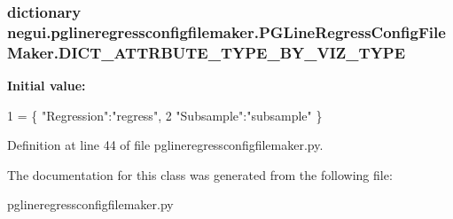 \subsubsection[{\texorpdfstring{D\+I\+C\+T\+\_\+\+A\+T\+T\+R\+B\+U\+T\+E\+\_\+\+T\+Y\+P\+E\+\_\+\+B\+Y\+\_\+\+V\+I\+Z\+\_\+\+T\+Y\+PE}{DICT_ATTRBUTE_TYPE_BY_VIZ_TYPE}}]{\setlength{\rightskip}{0pt plus 5cm}dictionary negui.\+pglineregressconfigfilemaker.\+P\+G\+Line\+Regress\+Config\+File\+Maker.\+D\+I\+C\+T\+\_\+\+A\+T\+T\+R\+B\+U\+T\+E\+\_\+\+T\+Y\+P\+E\+\_\+\+B\+Y\+\_\+\+V\+I\+Z\+\_\+\+T\+Y\+PE\hspace{0.3cm}{\ttfamily [static]}}\hypertarget{classnegui_1_1pglineregressconfigfilemaker_1_1PGLineRegressConfigFileMaker_ae1c084179b0f58c480d6809e46361a9f}{}\label{classnegui_1_1pglineregressconfigfilemaker_1_1PGLineRegressConfigFileMaker_ae1c084179b0f58c480d6809e46361a9f}
{\bfseries Initial value\+:}
\begin{DoxyCode}
1 = \{ \textcolor{stringliteral}{"Regression"}:\textcolor{stringliteral}{"regress"}, 
2                                         \textcolor{stringliteral}{"Subsample"}:\textcolor{stringliteral}{"subsample"} \}
\end{DoxyCode}


Definition at line 44 of file pglineregressconfigfilemaker.\+py.



The documentation for this class was generated from the following file\+:\begin{DoxyCompactItemize}
\item 
pglineregressconfigfilemaker.\+py\end{DoxyCompactItemize}
